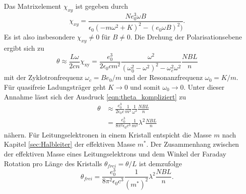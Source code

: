 \noindent
Das Matrixelement $\chi_{xy}$ ist gegeben durch 
\begin{equation*}
    \chi_{xy}=\frac{Ne_0^3\omega B}{\epsilon_0(-m\omega^2+K)^2-(e_0\omega B)^2)} .
\end{equation*}
Es ist also insbesondere $\chi_{xy}\neq 0$ für $B\neq 0$. Die Drehung der Polarisationsebene ergibt sich zu 
\begin{equation}
    \theta\approx\frac{L\omega}{2cn}\chi_\text{xy}=\frac{e_0^3}{2\epsilon_0 c m^2}\frac{\omega^2}{(\omega_0^2-\omega^2)^2-\omega_c^2\omega^2}\frac{NBL}{n}
    \label{eqn:theta_kompliziert}
\end{equation}
mit der Zyklotronfrequenz $\omega_c=Be_0/m$ und der Resonanzfrequenz $\omega_0=K/m$. 
Für quasifreie Ladungsträger geht $K\to0$ und somit $\omega_0\to 0$. Unter dieser Annahme lässt sich der Ausdruck 
\ref{eqn:theta_kompliziert} zu
\begin{align*}
    \theta&\approx\frac{e_0^3}{2\epsilon_0 c}\frac{1}{m^2}\frac{1}{\omega^2}\frac{NBL}{n}\\
    &=\frac{e_0^3}{8\pi^2\epsilon_0c^3}\frac{1}{m^2}\lambda^2\frac{NBL}{n}
\end{align*} 
nähern. Für Leitungselektronen in einem Kristall entspicht die Masse $m$ nach Kapitel \ref{sec:Halbleiter} der effektiven
Masse $m^*$. Der Zusammenhang zwischen der effektiven Masse eines Leitungselektrons und dem Winkel der Faraday Rotation pro
Länge des Kristalls $\theta_{frei}=\theta/L$ ist demzufolge
\begin{equation}
    \theta_{frei}=\frac{e_0^3}{8\pi^2\epsilon_0c^3}\frac{1}{(m^*)^2}\lambda^2\frac{NBL}{n}.
    \label{eqn:winkel_masse}
\end{equation}
